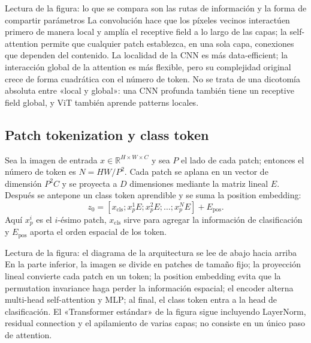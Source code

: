 \begin{knowledgebox}{Lectura de la figura: lo que se compara son las rutas de información y la forma de compartir parámetros}
La convolución hace que los píxeles vecinos interactúen primero de manera local y amplía el receptive field a lo largo de las capas; la self-attention permite que cualquier patch establezca, en una sola capa, conexiones que dependen del contenido. La localidad de la CNN es más data-efficient; la interacción global de la attention es más flexible, pero su complejidad original crece de forma cuadrática con el número de token. No se trata de una dicotomía absoluta entre «local y global»: una CNN profunda también tiene un receptive field global, y ViT también aprende patterns locales.
\end{knowledgebox}

\subsection{Patch tokenization y class token}

Sea la imagen de entrada $x\in\mathbb{R}^{H\times W\times C}$ y sea $P$ el lado de cada patch; entonces el número de token es $N=HW/P^2$. Cada patch se aplana en un vector de dimensión $P^2C$ y se proyecta a $D$ dimensiones mediante la matriz lineal $E$. Después se antepone un class token aprendible y se suma la position embedding:
\[
z_0=[x_{\mathrm{cls}};x_p^1E;x_p^2E;\ldots;x_p^NE]+E_{\mathrm{pos}}.
\]
Aquí $x_p^i$ es el $i$-ésimo patch, $x_{\mathrm{cls}}$ sirve para agregar la información de clasificación y $E_{\mathrm{pos}}$ aporta el orden espacial de los token.


\begin{knowledgebox}{Lectura de la figura: el diagrama de la arquitectura se lee de abajo hacia arriba}
En la parte inferior, la imagen se divide en patches de tamaño fijo; la proyección lineal convierte cada patch en un token; la position embedding evita que la permutation invariance haga perder la información espacial; el encoder alterna multi-head self-attention y MLP; al final, el class token entra a la head de clasificación. El «Transformer estándar» de la figura sigue incluyendo LayerNorm, residual connection y el apilamiento de varias capas; no consiste en un único paso de attention.
\end{knowledgebox}


